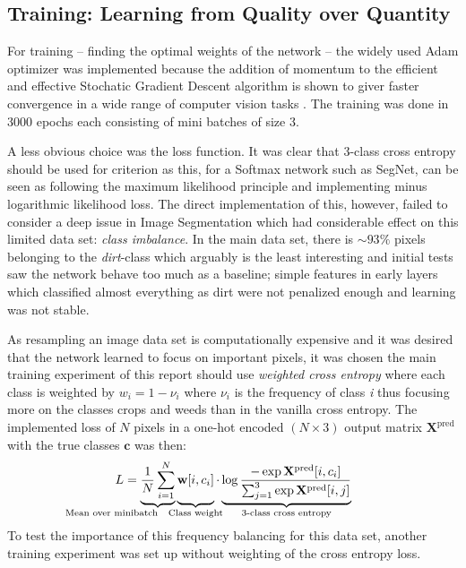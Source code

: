\documentclass{article}
\begin{document}
\subsection{Training: Learning from Quality over Quantity}
For training -- finding the optimal weights of the network -- the widely used Adam optimizer  was implemented because the addition of momentum to the efficient and effective Stochatic Gradient Descent algorithm is shown to giver faster convergence in a wide range of computer vision tasks \cite{Adam}. The training was done in 3000 epochs each consisting of mini batches of size 3.

A less obvious choice was the loss function. It was clear that 3-class cross entropy should be used for criterion as this, for a Softmax network such as SegNet, can be seen as following the maximum likelihood principle and implementing minus logarithmic likelihood loss. The direct implementation of this, however, failed to consider a deep issue in Image Segmentation which had considerable effect on this limited data set: \textit{class imbalance}. 
In the main data set, there is \(\sim 93 \%\) pixels belonging to the \textit{dirt}-class which arguably is the least interesting and initial tests saw the network behave too much as a baseline; simple features in early layers which classified almost everything as dirt were not penalized enough and learning was not stable. 

As resampling an image data set is computationally expensive and it was desired that the network learned to focus on important pixels, it was chosen the main training experiment of this report should use \textit{weighted cross entropy} where each class is weighted by \(w_i = 1-\nu_i\) where \(\nu_i\) is the frequency of class \textit{i} thus focusing more on the classes crops and weeds than in the vanilla cross entropy. The implemented loss of \(N\) pixels in a one-hot encoded \((N \times  3)\) output matrix \(\mathbf X^\text{pred}\) with the true classes \(\mathbf c\) was then:
\[
L = \underbrace{
	\vphantom{\sum_{i}}
	\frac 1 N
	\sum_{\mathclap {i=1}}^{N}
}
_{\mathllap{\text{Mean over minibatch}}}
\underbrace{ 
	\vphantom{\sum_{i}}
	\mathbf{w}[i, c_i]}
_{\mathclap{\text{Class weight}}}  
\cdot 
\underbrace{
	\log 
	\frac
	{-\exp\mathbf X^\text{pred}[i, c_i]}
	{\sum_{j=1}^{3}\exp\mathbf X^\text{pred}[i, j]}
}_{\mathclap{\text{3-class cross entropy}}}
\] 
To test the importance of this frequency balancing for this data set, another training experiment was set up without weighting of the cross entropy loss.
\end{document}
